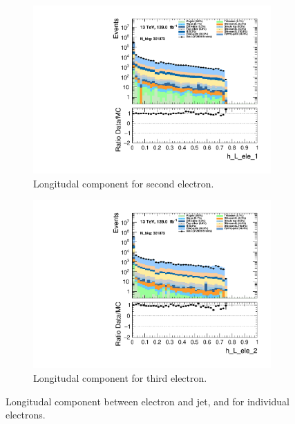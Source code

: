 \begin{figure}
\begin{subfigure}{.49\textwidth}
        \includegraphics[width=\textwidth]{Figures/MC_Data_comp/h_L_ele_1.pdf}
        \caption{Longitudal component for second electron. }
        \label{fig:h_L_ele_1}
    \end{subfigure}
    \hfill
    \begin{subfigure}{.49\textwidth}
        \includegraphics[width=\textwidth]{Figures/MC_Data_comp/h_L_ele_2.pdf}
        \caption{ Longitudal component for third electron.}
        \label{fig:h_L_ele_2}
    \end{subfigure}
    \hfill       
    \caption{Longitudal component between electron and jet, and for individual electrons.}
    \label{fig:batch6_feats}
\end{figure}

